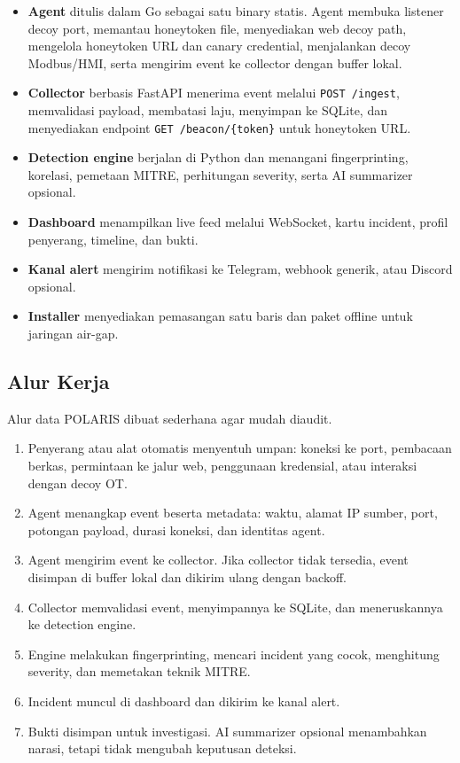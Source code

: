 \documentclass[12pt,a4paper]{article}
\begin{document}
\begin{itemize}[leftmargin=1.2cm,itemsep=2pt,topsep=2pt]
  \item \textbf{Agent} ditulis dalam Go sebagai satu binary statis. Agent membuka listener decoy port, memantau honeytoken file, menyediakan web decoy path, mengelola honeytoken URL dan canary credential, menjalankan decoy Modbus/HMI, serta mengirim event ke collector dengan buffer lokal.
  \item \textbf{Collector} berbasis FastAPI menerima event melalui \texttt{POST /ingest}, memvalidasi payload, membatasi laju, menyimpan ke SQLite, dan menyediakan endpoint \texttt{GET /beacon/\{token\}} untuk honeytoken URL.
  \item \textbf{Detection engine} berjalan di Python dan menangani fingerprinting, korelasi, pemetaan MITRE, perhitungan severity, serta AI summarizer opsional.
  \item \textbf{Dashboard} menampilkan live feed melalui WebSocket, kartu incident, profil penyerang, timeline, dan bukti.
  \item \textbf{Kanal alert} mengirim notifikasi ke Telegram, webhook generik, atau Discord opsional.
  \item \textbf{Installer} menyediakan pemasangan satu baris dan paket offline untuk jaringan air-gap.
\end{itemize}

\subsection{Alur Kerja}

Alur data POLARIS dibuat sederhana agar mudah diaudit.

\begin{enumerate}[leftmargin=1.2cm,itemsep=2pt,topsep=2pt]
  \item Penyerang atau alat otomatis menyentuh umpan: koneksi ke port, pembacaan berkas, permintaan ke jalur web, penggunaan kredensial, atau interaksi dengan decoy OT.
  \item Agent menangkap event beserta metadata: waktu, alamat IP sumber, port, potongan payload, durasi koneksi, dan identitas agent.
  \item Agent mengirim event ke collector. Jika collector tidak tersedia, event disimpan di buffer lokal dan dikirim ulang dengan backoff.
  \item Collector memvalidasi event, menyimpannya ke SQLite, dan meneruskannya ke detection engine.
  \item Engine melakukan fingerprinting, mencari incident yang cocok, menghitung severity, dan memetakan teknik MITRE.
  \item Incident muncul di dashboard dan dikirim ke kanal alert.
  \item Bukti disimpan untuk investigasi. AI summarizer opsional menambahkan narasi, tetapi tidak mengubah keputusan deteksi.
\end{enumerate}
\end{document}
